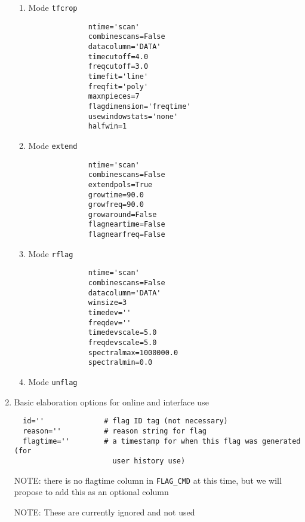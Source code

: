 \begin{enumerate}
\begin{enumerate}
\item Mode {\tt tfcrop}
\small
\begin{verbatim}
              ntime='scan'
              combinescans=False
              datacolumn='DATA' 
              timecutoff=4.0 
              freqcutoff=3.0
              timefit='line'
              freqfit='poly'
              maxnpieces=7 
              flagdimension='freqtime' 
              usewindowstats='none'
              halfwin=1 
\end{verbatim}
\normalsize  
         
\item Mode {\tt extend}
\small
\begin{verbatim}
              ntime='scan'
              combinescans=False
              extendpols=True
              growtime=90.0
              growfreq=90.0
              growaround=False
              flagneartime=False
              flagnearfreq=False
\end{verbatim}
\normalsize  
 
\item Mode {\tt rflag}
\small
\begin{verbatim}
              ntime='scan'
              combinescans=False
              datacolumn='DATA'
              winsize=3
              timedev=''
              freqdev=''
              timedevscale=5.0
              freqdevscale=5.0
              spectralmax=1000000.0
              spectralmin=0.0
\end{verbatim}
\normalsize  
              
\item Mode {\tt unflag}
              
\end{enumerate}
              
\item Basic elaboration options for online and interface use

\small
\begin{verbatim}
  id=''              # flag ID tag (not necessary)
  reason=''          # reason string for flag
  flagtime=''        # a timestamp for when this flag was generated (for 
                       user history use)
\end{verbatim}
\normalsize

NOTE: there is no flagtime column in {\tt FLAG\_CMD} at this time, but we
will propose to add this as an optional column

NOTE: These are currently ignored and not used


\end{enumerate}
